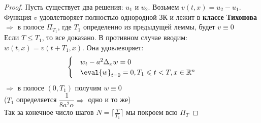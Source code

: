 \begin{itemize}
\begin{theorem}
\begin{proof}
Пусть существует два решения: $u_1$ и $u_2$. Возьмем $v(t,x) = u_2 - u_1$. Функция $v$ удовлетворяет полностью однородной ЗК и лежит в {\bf классе Тихонова} 
$\Rightarrow$ в полосе $\Pi_{T_1}$, где $T_1$ определенно из предыдущей леммы, будет $v\equiv 0$\\
Если $T \leq T_1$, то все доказано. В противном случае вводим:\\
$w(t,x) = v(t+T_1,x)$. Она удовлеворяет:
  \begin{equation}
  \begin{cases}
  & w_t - a^2\Delta_xw=0\\
  &\eval{w}_{t=0} = 0, T_1 \leq t < T,x \in \R^n
  \end{cases}
  \end{equation}
$\Rightarrow$ в полосе $(0,T_1)$ получим $w \equiv 0$\\
($T_1$ определяется $\dfrac{1}{8a^2\alpha} \Rightarrow$ одно и то же)\\
Так за конечное число шагов $N = \lceil{\frac{T}{T_1}} \rceil$ мы покроем всю $\Pi_T$
\end{proof} 
\end{theorem}


\end{itemize}



